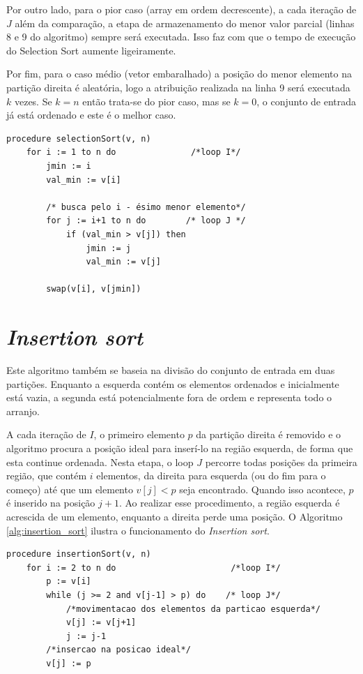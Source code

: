 \documentclass[12pt]{article}
\begin{document}
Por outro lado, para o pior caso (array em ordem decrescente), a cada iteração de $J$ além da comparação, a etapa de armazenamento do menor valor parcial (linhas 8 e 9 do algoritmo) sempre será executada. Isso faz com que o tempo de execução do Selection Sort aumente ligeiramente.

Por fim, para o caso médio (vetor embaralhado) a posição do menor elemento na partição direita é aleatória, logo a atribuição realizada na linha 9 será executada $k$ vezes. Se $k=n$ então trata-se do pior caso, mas se $k=0$, o conjunto de entrada já está ordenado e este é o melhor caso.

\begin{lstlisting}[caption=Selection Sort, float, label=alg:selection_sort, captionpos=b, h]
procedure selectionSort(v, n)
    for i := 1 to n do               /*loop I*/
        jmin := i
        val_min := v[i]
        
        /* busca pelo i - ésimo menor elemento*/
        for j := i+1 to n do        /* loop J */
            if (val_min > v[j]) then
                jmin := j
                val_min := v[j]
        
        swap(v[i], v[jmin])
\end{lstlisting}




\section{\textit{Insertion sort}}

Este algoritmo também se baseia na divisão do conjunto de entrada em duas partições. Enquanto a esquerda contém os elementos ordenados e inicialmente está vazia, a segunda está potencialmente fora de ordem e representa todo o arranjo.

A cada iteração de $I$, o primeiro elemento $p$ da partição direita é removido e o algoritmo procura a posição ideal para inserí-lo na região esquerda, de forma que esta continue ordenada. Nesta etapa, o loop $J$ percorre todas posições da primeira região, que contém $i$ elementos, da direita para esquerda (ou do fim para o começo) até que um elemento $v[j] < p$ seja encontrado. Quando isso acontece, $p$ é inserido na posição $j+1$. Ao realizar esse procedimento, a região esquerda é acrescida de um elemento, enquanto a direita perde uma posição. O Algoritmo \ref{alg:insertion_sort} ilustra o funcionamento do \textit{Insertion sort}.

\begin{lstlisting}[caption=Insertion Sort, float, label=alg:insertion_sort, captionpos=b, h]
procedure insertionSort(v, n)
    for i := 2 to n do                       /*loop I*/
        p := v[i]
        while (j >= 2 and v[j-1] > p) do    /* loop J*/
            /*movimentacao dos elementos da particao esquerda*/
            v[j] := v[j+1]
            j := j-1
        /*insercao na posicao ideal*/
        v[j] := p
\end{lstlisting}
\end{document}

